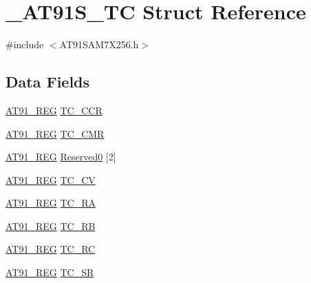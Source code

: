 \hypertarget{struct__AT91S__TC}{\section{\-\_\-\-A\-T91\-S\-\_\-\-T\-C Struct Reference}
\label{struct__AT91S__TC}
}


{\ttfamily \#include $<$A\-T91\-S\-A\-M7\-X256.\-h$>$}

\subsection*{Data Fields}
\begin{DoxyCompactItemize}
\item 
\hyperlink{GCC_2ARM7__AT91SAM7S_2AT91SAM7X256_8h_a712ad5a1ac1bd02f3e95a7526c283ce1}{A\-T91\-\_\-\-R\-E\-G} \hyperlink{struct__AT91S__TC_aa6bd25995b743fce28cad60014bcc19d}{T\-C\-\_\-\-C\-C\-R}
\item 
\hyperlink{GCC_2ARM7__AT91SAM7S_2AT91SAM7X256_8h_a712ad5a1ac1bd02f3e95a7526c283ce1}{A\-T91\-\_\-\-R\-E\-G} \hyperlink{struct__AT91S__TC_a8f785d881b6e0a859187ca8cfb3f1b9c}{T\-C\-\_\-\-C\-M\-R}
\item 
\hyperlink{GCC_2ARM7__AT91SAM7S_2AT91SAM7X256_8h_a712ad5a1ac1bd02f3e95a7526c283ce1}{A\-T91\-\_\-\-R\-E\-G} \hyperlink{struct__AT91S__TC_af1ae45e2103e19f10fde08c2476de94e}{Reserved0} \mbox{[}2\mbox{]}
\item 
\hyperlink{GCC_2ARM7__AT91SAM7S_2AT91SAM7X256_8h_a712ad5a1ac1bd02f3e95a7526c283ce1}{A\-T91\-\_\-\-R\-E\-G} \hyperlink{struct__AT91S__TC_ac5fda5dfb1c8d684760677f9531e4707}{T\-C\-\_\-\-C\-V}
\item 
\hyperlink{GCC_2ARM7__AT91SAM7S_2AT91SAM7X256_8h_a712ad5a1ac1bd02f3e95a7526c283ce1}{A\-T91\-\_\-\-R\-E\-G} \hyperlink{struct__AT91S__TC_a1a5a8c31c01b731a58c17dbd315c693a}{T\-C\-\_\-\-R\-A}
\item 
\hyperlink{GCC_2ARM7__AT91SAM7S_2AT91SAM7X256_8h_a712ad5a1ac1bd02f3e95a7526c283ce1}{A\-T91\-\_\-\-R\-E\-G} \hyperlink{struct__AT91S__TC_a0ae10f9a6d3695b17618f62d254c2f20}{T\-C\-\_\-\-R\-B}
\item 
\hyperlink{GCC_2ARM7__AT91SAM7S_2AT91SAM7X256_8h_a712ad5a1ac1bd02f3e95a7526c283ce1}{A\-T91\-\_\-\-R\-E\-G} \hyperlink{struct__AT91S__TC_adf8a3862cc1c6e10f09b682e36dcac2a}{T\-C\-\_\-\-R\-C}
\item 
\hyperlink{GCC_2ARM7__AT91SAM7S_2AT91SAM7X256_8h_a712ad5a1ac1bd02f3e95a7526c283ce1}{A\-T91\-\_\-\-R\-E\-G} \hyperlink{struct__AT91S__TC_a530883d094b52082a5d1fdd12e143eb2}{T\-C\-\_\-\-S\-R}

\end{DoxyCompactItemize}
